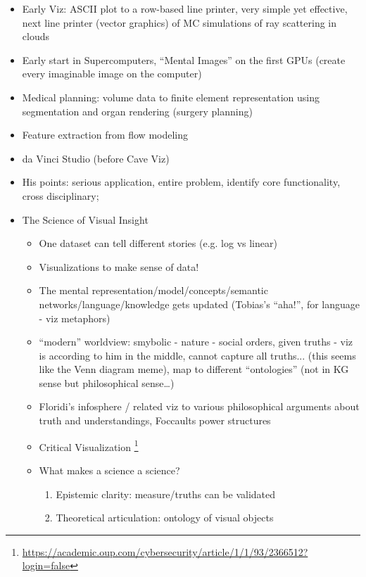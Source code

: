 \documentclass[a4paper]{article}
\begin{document}
\begin{itemize}
    \item Early Viz: ASCII plot to a row-based line printer, very simple yet effective, next line printer (vector graphics) of MC simulations of ray scattering in clouds
    \item Early start in Supercomputers, \enquote{Mental Images} on the first GPUs (create every imaginable image on the computer)
    \item Medical planning: volume data to finite element representation using segmentation and organ rendering (surgery planning)
    \item Feature extraction from flow modeling
    \item da Vinci Studio (before Cave Viz)
    \item His points: serious application, entire problem, identify core functionality, cross disciplinary;
    \item The Science of Visual Insight
          \begin{itemize}
              \item One dataset can tell different stories (e.g. log vs linear)
              \item Visualizations to make sense of data!
              \item The mental representation/model/concepts/semantic networks/language/knowledge gets updated (Tobias's \enquote{aha!}, for language - viz metaphors)
              \item \enquote{modern} worldview: smybolic - nature - social orders, given truths - viz is according to him in the middle, cannot capture all truths... (this seems like the Venn diagram meme), map to different \enquote{ontologies} (not in KG sense but philosophical sense\dots)
              \item Floridi's infosphere / related viz to various philosophical arguments about truth and understandings, Foccaults power structures
              \item Critical Visualization \footnote{\url{https://academic.oup.com/cybersecurity/article/1/1/93/2366512?login=false}}
              \item What makes a science a science?
                    \begin{enumerate}
                        \item Epistemic clarity: measure/truths can be validated
                        \item Theoretical articulation: ontology of visual objects

\end{enumerate}
\end{itemize}
\end{itemize}
\end{document}
